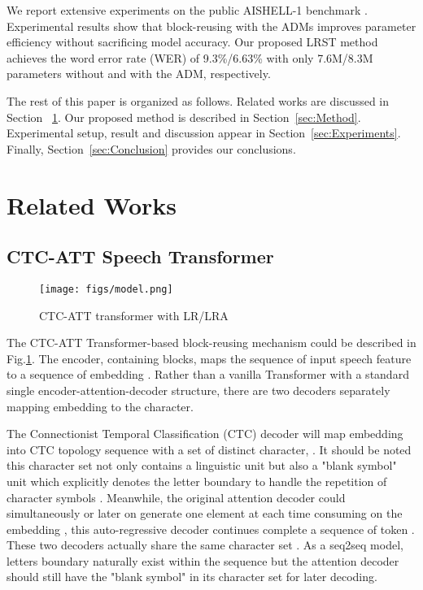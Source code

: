 \documentclass{INTERSPEECH2023}
\begin{document}
We report extensive experiments on the public AISHELL-1 benchmark \cite{bu2017aishell}. Experimental results show that block-reusing with the ADMs improves parameter efficiency without sacrificing model accuracy. Our proposed LRST method achieves the word error rate (WER) of 9.3\%/6.63\% with only 7.6M/8.3M parameters without and with the ADM, respectively.

The rest of this paper is organized as follows. Related works are discussed in Section ~\ref{sec:Related}. Our proposed method is described in Section~\ref{sec:Method}. Experimental setup, result and discussion appear in Section~\ref{sec:Experiments}. Finally, Section~\ref{sec:Conclusion} provides our conclusions.
 \section{Related Works} \label{sec:Related}
\subsection{CTC-ATT Speech Transformer}
\begin{figure}
    \centering
    \texttt{[image: figs/model.png]}
    \caption{CTC-ATT transformer with LR/LRA}
    \label{fig:model}
\end{figure}
The CTC-ATT Transformer-based \cite{nakatani2019improving} block-reusing mechanism could be described in Fig.\ref{fig:model}. The encoder, containing  blocks, maps the sequence of input speech feature  to a sequence of embedding . Rather than a vanilla Transformer with a standard single encoder-attention-decoder structure, there are two decoders separately mapping embedding to the character.


The Connectionist Temporal Classification (CTC) decoder will map embedding  into CTC topology sequence  with a set of distinct character, . It should be noted this character set not only contains a linguistic unit but also a "blank symbol" unit which explicitly denotes the letter boundary to handle the repetition of character symbols \cite{graves2006connectionist}. Meanwhile, the original attention decoder could simultaneously or later on generate one element at each time consuming on the embedding , this auto-regressive decoder continues complete a sequence of token . These two decoders actually share the same character set . As a seq2seq model, letters boundary naturally exist within the sequence but the attention decoder should still have the "blank symbol" in its character set for later decoding. 
\end{document}
